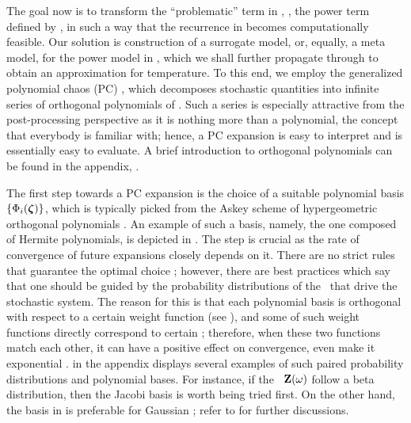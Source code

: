 
The goal now is to transform the ``problematic'' term in , \ie, the power term defined by , in such a way that the recurrence in  becomes computationally feasible. Our solution is construction of a surrogate model, or, equally, a meta model, for the power model in , which we shall further propagate through  to obtain an approximation for temperature. To this end, we employ the generalized polynomial chaos (PC) \cite{xiu2002}, which decomposes stochastic quantities into infinite series of orthogonal polynomials of \rvs. Such a series is especially attractive from the post-processing perspective as it is nothing more than a polynomial, the concept that everybody is familiar with; hence, a PC expansion is easy to interpret and is essentially easy to evaluate. A brief introduction to orthogonal polynomials can be found in the appendix, .

The first step towards a PC expansion is the choice of a suitable polynomial basis $\{ \Phi_i(\boldsymbol{\zeta}) \}$, which is typically picked from the Askey scheme of hypergeometric orthogonal polynomials \cite{xiu2002}. An example of such a basis, namely, the one composed of Hermite polynomials, is depicted in . The step is crucial as the rate of convergence of future expansions closely depends on it. There are no strict rules that guarantee the optimal choice \cite{maitre2010, knio2006}; however, there are best practices which say that one should be guided by the probability distributions of the \rvs\ that drive the stochastic system. The reason for this is that each polynomial basis is orthogonal with respect to a certain weight function (see ), and some of such weight functions directly correspond to certain \pdfs; therefore, when these two functions match each other, it can have a positive effect on convergence, even make it exponential \cite{xiu2002}.  in the appendix displays several examples of such paired probability distributions and polynomial bases. For instance, if the \rvs\ $\mathbf{Z}(\omega)$ follow a beta distribution, then the Jacobi basis is worth being tried first. On the other hand, the basis in  is preferable for Gaussian \rvs; refer to \cite{xiu2010, xiu2002} for further discussions.

